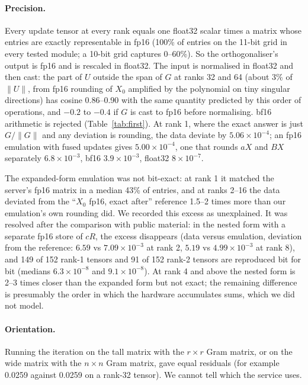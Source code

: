 \documentclass[11pt]{article}
\begin{document}
\paragraph{Precision.} Every update tensor at every rank equals one float32 scalar times a matrix
whose entries are exactly representable in fp16 (100\% of entries on the 11-bit grid in every tested
module; a 10-bit grid captures 0--60\%). So the orthogonaliser's output is fp16 and is rescaled in
float32. The input is normalised in float32 and then cast: the part of $U$ outside the span of $G$
at ranks 32 and 64 (about 3\% of $\|U\|$, from fp16 rounding of $X_0$ amplified by the polynomial
on tiny singular directions) has cosine 0.86--0.90 with the same quantity predicted by this order of
operations, and $-0.2$ to $-0.4$ if $G$ is cast to fp16 before normalising. bf16 arithmetic is
rejected (Table~\ref{tab:first}). At rank 1, where the exact answer is just $G/\|G\|$ and any
deviation is rounding, the data deviate by $5.06\times10^{-4}$; an fp16 emulation with fused updates
gives $5.00\times10^{-4}$, one that rounds $aX$ and $BX$ separately $6.8\times10^{-3}$, bf16
$3.9\times10^{-3}$, float32 $8\times10^{-7}$.

The expanded-form emulation was not bit-exact: at rank 1 it matched the server's fp16 matrix in a
median 43\% of entries, and at ranks 2--16 the data deviated from the ``$X_0$ fp16, exact after''
reference 1.5--2 times more than our emulation's own rounding did. We recorded this excess as
unexplained. It was resolved after the comparison with public material: in the nested form with a
separate fp16 store of $cR$, the excess disappears (data versus emulation, deviation from the
reference: $6.59$ vs $7.09\times10^{-3}$ at rank 2, $5.19$ vs $4.99\times10^{-3}$ at rank 8), and
149 of 152 rank-1 tensors and 91 of 152 rank-2 tensors are reproduced bit for bit (medians
$6.3\times10^{-8}$ and $9.1\times10^{-8}$). At rank 4 and above the nested form is 2--3 times closer
than the expanded form but not exact; the remaining difference is presumably the order in which the
hardware accumulates sums, which we did not model.

\paragraph{Orientation.} Running the iteration on the tall matrix with the $r\times r$ Gram matrix,
or on the wide matrix with the $n\times n$ Gram matrix, gave equal residuals (for example 0.0259
against 0.0259 on a rank-32 tensor). We cannot tell which the service uses.
\end{document}

